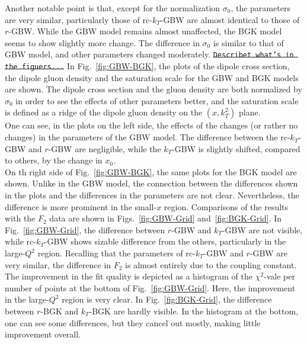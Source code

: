 \documentclass[11pt]{article}
\numberwithin{equation}{section}
\numberwithin{table}{section}
\numberwithin{figure}{section}
\newcommand{\comment}[1]{\texttt{\color{red}#1}}
\begin{document}
Another notable point is that, except for the normalization $\sigma_0$, the parameters are very similar, particularly those of rc-$k_T$-GBW are almost identical to those of $r$-GBW. 
While the GBW model remains almost unaffected, the BGK model seems to show slightly more change. The difference in $\sigma_0$ is similar to that of GBW model, and other parameters changed moderately.
\sout{\comment{Describet what's in the figuers...} }
In Fig.~\ref{fig:GBW-BGK}, the plots of the dipole cross section, the dipole gluon density and the saturation scale for the GBW and BGK models are shown. The dipole cross section and the gluon density are both normalized by $\sigma_0$ in order to see the effects  of other parameters better,
and the saturation scale is defined as a ridge of the dipole gluon density on the $(x,k_T^2)$ plane.\\
One can see, in the plots on the left side, the effects of the changes (or rather no changes) in the parameters of the GBW model. The difference between the rc-$k_T$-GBW and $r$-GBW are negligible, while the $k_T$-GBW is slightly shifted, compared to others, by the change in $x_0$.\\
On th right side of Fig.~\ref{fig:GBW-BGK}, the same plots for the BGK model are shown.
Unlike in the GBW model, the connection between the differences shown in the plots and the differences in the parameters are not clear. Nevertheless, the difference is more prominent in the small-$x$ region.
Comparisons of the results with the $F_2$ data are shown in Figs.~\ref{fig:GBW-Grid} and~\ref{fig:BGK-Grid}.
In Fig.~\ref{fig:GBW-Grid}, the difference between $r$-GBW and $k_T$-GBW are not visible, while rc-$k_T$-GBW shows sizable difference from the others, particularly in the large-$Q^2$ region. 
Recalling that the parameters of rc-$k_T$-GBW and $r$-GBW are very similar, the difference in $F_2$ is almost entirely due to the coupling constant. The improvement in the fit quality is depicted as a histogram of the $\chi^2$-vale per number of points at the bottom of Fig.~\ref{fig:GBW-Grid}. Here, the improvement in the large-$Q^2$ region is very clear.
In Fig.~\ref{fig:BGK-Grid}, the difference between $r$-BGK and $k_T$-BGK are hardly visible. In the histogram at the bottom, one can see some differences, but they cancel out mostly, making little improvement overall.
\end{document}
